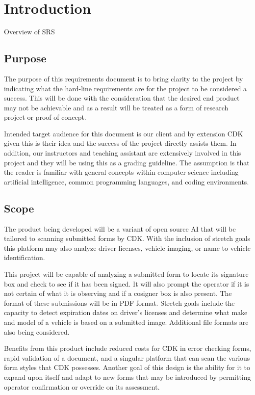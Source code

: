 \documentclass[onecolumn, draftclsnofoot,10pt, compsoc]{IEEEtran}
\begin{document}
\newpage
{}
\tableofcontents
\clearpage

\section{Introduction}
Overview of SRS

\subsection{Purpose}
The purpose of this requirements document is to bring clarity to the project by indicating what the hard-line requirements are for the project to be considered a success. This will be done with the consideration that the desired end product may not be achievable and as a result will be treated as a form of research project or proof of concept.

Intended target audience for this document is our client and by extension CDK given this is their idea and the success of the project directly assists them. In addition, our instructors and teaching assistant are extensively involved in this project and they will be using this as a grading guideline. The assumption is that the reader is familiar with general concepts within computer science including artificial intelligence, common programming languages, and coding environments.


\subsection{Scope}
The product being developed will be a variant of open source AI that will be tailored to scanning submitted forms by CDK. With the inclusion of stretch goals this platform may also analyze driver licenses, vehicle imaging, or name to vehicle identification. 

This project will be capable of analyzing a submitted form to locate its signature box and check to see if it has been signed. It will also prompt the operator if it is not certain of what it is observing and if a cosigner box is also present. The format of these submissions will be in PDF format. Stretch goals include the capacity to detect expiration dates on driver’s licenses and determine what make and model of a vehicle is based on a submitted image. Additional file formats are also being considered.

Benefits from this product include reduced costs for CDK in error checking forms, rapid validation of a document, and a singular platform that can scan the various form styles that CDK possesses. Another goal of this design is the ability for it to expand upon itself and adapt to new forms that may be introduced by permitting operator confirmation or override on its assessment. 
\end{document}
